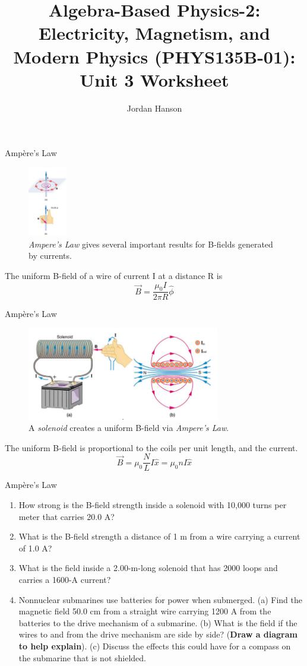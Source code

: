 \documentclass{beamer}
\title{Algebra-Based Physics-2: Electricity, Magnetism, and Modern Physics (PHYS135B-01): Unit 3 Worksheet}
\author{Jordan Hanson}
\institute{Whittier College Department of Physics and Astronomy}
\begin{document}
\begin{frame}{Amp\`{e}re's Law}
\begin{figure}
\centering
\includegraphics[width=0.15\textwidth]{figures/amplawrhr.png}
\caption{\label{fig:amplaw} \textit{Ampere's Law} gives several important results for B-fields generated by currents.}
\end{figure}
The uniform B-field of a wire of current I at a distance R is
\begin{equation}
\vec{B} = \frac{\mu_0 I}{2\pi R} \hat{\phi}
\end{equation}
\end{frame}

\begin{frame}{Amp\`{e}re's Law}
\begin{figure}
\centering
\includegraphics[width=0.75\textwidth]{figures/solenoid.png}
\caption{\label{fig:solenoid} A \textit{solenoid} creates a uniform B-field via \textit{Ampere's Law}.}
\end{figure}
The uniform B-field is proportional to the coils per unit length, and the current.
\begin{equation}
\vec{B} = \mu_0 \frac{N}{L} I \hat{x} = \mu_0 n I \hat{x}
\end{equation}
\end{frame}

\begin{frame}{Amp\`{e}re's Law}
\begin{enumerate}
\item How strong is the B-field strength inside a solenoid with 10,000 turns per meter that carries 20.0 A?
\item What is the B-field strength a distance of 1 m from a wire carrying a current of 1.0 A?
\item What is the field inside a 2.00-m-long solenoid that has 2000 loops and carries a 1600-A current?
\item Nonnuclear submarines use batteries for power when
submerged. (a) Find the magnetic field 50.0 cm from a
straight wire carrying 1200 A from the batteries to the drive
mechanism of a submarine. (b) What is the field if the wires to
and from the drive mechanism are side by side? (\textbf{Draw a diagram to help explain}). (c) Discuss
the effects this could have for a compass on the submarine
that is not shielded.
\end{enumerate}
\end{frame}
\end{document}
